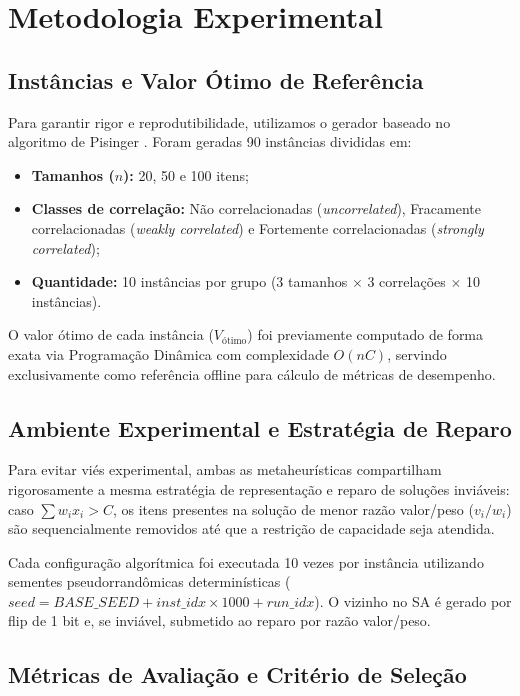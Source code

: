 \documentclass[12pt]{article}
\begin{document}
\section{Metodologia Experimental}

\subsection{Instâncias e Valor Ótimo de Referência}

Para garantir rigor e reprodutibilidade, utilizamos o gerador baseado no algoritmo de Pisinger \cite{pisinger2005, pisinger_generator}. Foram geradas 90 instâncias divididas em:
\begin{itemize}
    \item \textbf{Tamanhos ($n$):} 20, 50 e 100 itens;
    \item \textbf{Classes de correlação:} Não correlacionadas (\textit{uncorrelated}), Fracamente correlacionadas (\textit{weakly correlated}) e Fortemente correlacionadas (\textit{strongly correlated});
    \item \textbf{Quantidade:} 10 instâncias por grupo (3 tamanhos $\times$ 3 correlações $\times$ 10 instâncias).
\end{itemize}
O valor ótimo de cada instância ($V_{\text{ótimo}}$) foi previamente computado de forma exata via Programação Dinâmica com complexidade $O(nC)$, servindo exclusivamente como referência offline para cálculo de métricas de desempenho.

\subsection{Ambiente Experimental e Estratégia de Reparo}

Para evitar viés experimental, ambas as metaheurísticas compartilham rigorosamente a mesma estratégia de representação e reparo de soluções inviáveis: caso $\sum w_i x_i > C$, os itens presentes na solução de menor razão valor/peso ($v_i / w_i$) são sequencialmente removidos até que a restrição de capacidade seja atendida.

Cada configuração algorítmica foi executada 10 vezes por instância utilizando sementes pseudorrandômicas determinísticas ($seed = BASE\_SEED + inst\_idx \times 1000 + run\_idx$). O vizinho no SA é gerado por flip de 1 bit e, se inviável, submetido ao reparo por razão valor/peso.

\subsection{Métricas de Avaliação e Critério de Seleção}
\end{document}

